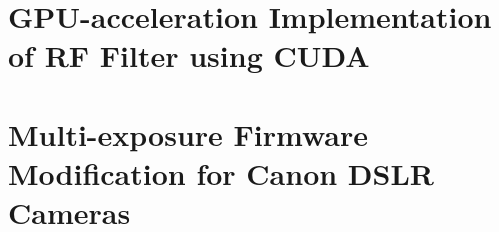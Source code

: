 \begin{appendices}
\chapter{GPU-acceleration Implementation of RF Filter using CUDA}
\label{apx:gpu}







\chapter{Multi-exposure Firmware Modification for Canon DSLR Cameras}
\label{apx:5dIII}


\end{appendices}